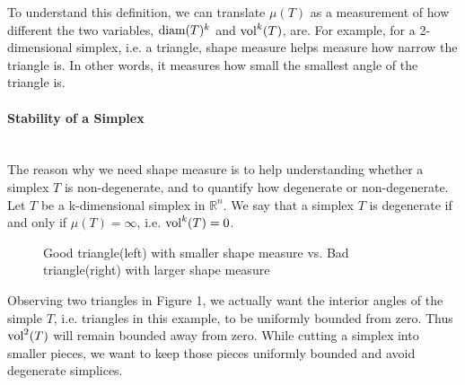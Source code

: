     To understand this definition, we can translate $\mu(T)$ as a measurement of how different the two variables, $\operatorname{diam}(T)^k$ and $\operatorname{vol}^k(T)$, are. For example, for a 2-dimensional simplex, i.e. a triangle, shape measure helps measure how narrow the triangle is. In other words, it measures how small the smallest angle of the triangle is.

    \paragraph{Stability of a Simplex}\mbox{}\\
    The reason why we need shape measure is to help understanding whether a simplex $T$ is non-degenerate, and to quantify how degenerate or non-degenerate. Let $T$ be a k-dimensional simplex in $\mathbb{R}^n$. We say that a simplex $T$ is degenerate if and only if $\mu(T) = \infty$, i.e. $\operatorname{vol}^k(T) = 0$. 

    
    \begin{figure}
    \centering
    \caption{Good triangle(left) with smaller shape measure vs. Bad triangle(right) with larger shape measure}
    \label{Fig1}
    \end{figure}

    Observing two triangles in Figure 1, we actually want the interior angles of the simple $T$, i.e. triangles in this example, to be uniformly bounded from zero. Thus $\operatorname{vol}^2(T)$ will remain bounded away from zero.
    While cutting a simplex into smaller pieces, we want to keep those pieces uniformly bounded and avoid degenerate simplices. \\

